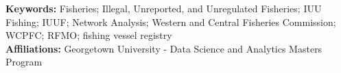 \vspace{1em}
\noindent\textbf{Keywords:} Fisheries; Illegal, Unreported, and Unregulated Fisheries; IUU Fishing; IUUF; Network Analysis; Western and Central Fisheries Commission; WCPFC; RFMO; fishing vessel registry\\
\hfill
\break
\noindent\textbf{Affiliations:} Georgetown University - Data Science and Analytics Masters Program
\newpage